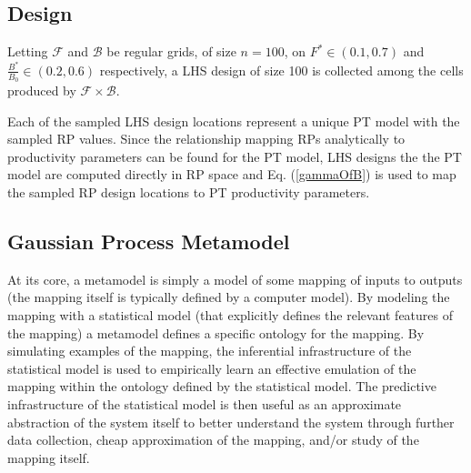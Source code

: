 %
\subsection{Design}

%
Letting $\mathcal{F}$ and $\mathcal{B}$ be regular grids, of size $n=100$, on
\mbox{$F^*\in(0.1, 0.7)$} and \mbox{$\frac{B^*}{B_0}\in(0.2, 0.6)$}
respectively, a LHS design of size 100 is collected among the cells produced by
$\mathcal{F}\times\mathcal{B}$. 

%
Each of the sampled LHS design locations represent a unique PT model with the
sampled RP values. Since the relationship mapping RPs analytically to productivity
parameters can be found for the PT model, LHS designs the the PT model are 
computed directly in RP space and Eq. (\ref{gammaOfB}) is used to map the
sampled RP design locations to PT productivity parameters.

%
\subsection{Gaussian Process Metamodel\label{gpmm}}
%

%
At its core, a metamodel is simply a model of some mapping of inputs to outputs
(the mapping itself is typically defined by a computer model). By modeling the
mapping with a statistical model (that explicitly defines the relevant features of the
mapping) a metamodel defines a specific ontology for the mapping.
By simulating examples of the mapping, the inferential infrastructure of the
statistical model is used to empirically learn an effective emulation of the
mapping within the ontology defined by the statistical model. %
The predictive infrastructure of the statistical model is then useful as an
approximate abstraction of the system itself to better understand the system
through further data collection, cheap approximation of the mapping, and/or study
of the mapping itself.

